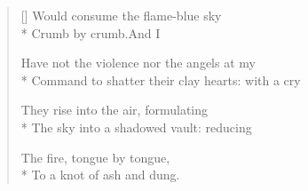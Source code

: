 \begin{verse}[\versewidth]
Would consume the flame-blue sky\\*
Crumb by crumb.\qquad And I

Have not the violence nor the angels at my\\*
Command to shatter their clay hearts: with a cry

They rise into the air, formulating\\*
The sky into a shadowed vault: reducing

The fire, tongue by tongue,\\*
To a knot of ash and dung.
\end{verse}
